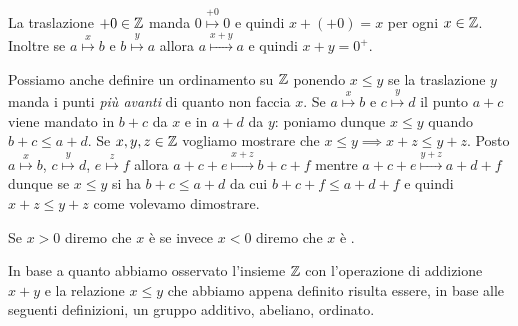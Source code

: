 La traslazione $+0\in {\mathbb Z}$ manda $0\stackrel{+0}\mapsto 0$ 
e quindi $x+(+0)=x$ per ogni $x\in {\mathbb Z}$.
Inoltre se $a\stackrel x\mapsto b$ e $b\stackrel y \mapsto a$ 
allora $a \stackrel{x+y} \mapsto a$ e quindi $x+y = 0^+$.

Possiamo anche definire un ordinamento su ${\mathbb Z}$ ponendo $x\le y$ 
se la traslazione $y$ manda i punti \emph{più avanti} di quanto 
non faccia $x$. 
Se $a\stackrel x\mapsto b$ e $c\stackrel y\mapsto d$ 
il punto $a+c$ viene mandato in $b+c$ da $x$ e in $a+d$ da $y$:
poniamo dunque $x\le y$ quando $b+c\le a+d$.
Se $x,y,z\in {\mathbb Z}$ vogliamo mostrare 
che $x\le y \implies x+z\le y+z$.
Posto $a\stackrel x\mapsto b$, $c\stackrel y\mapsto d$, 
$e\stackrel z\mapsto f$ 
allora $a+c+e \stackrel{x+z} \mapsto b + c+f$ 
mentre $a+c+e \stackrel{y+z} \mapsto a+d+f$ dunque 
se $x\le y$ si ha $b+c \le a+d$ da cui $b+c+f \le a+d+f$
e quindi $x+z \le y+z$ come volevamo dimostrare.

Se $x>0$ diremo che $x$ è 
se invece $x<0$ diremo che $x$ è .

In base a quanto abbiamo osservato l'insieme ${\mathbb Z}$ con l'operazione 
di addizione $x+y$ e la relazione $x\le y$ che abbiamo appena definito 
risulta essere, in base alle seguenti definizioni, 
un gruppo additivo, abeliano, ordinato.

